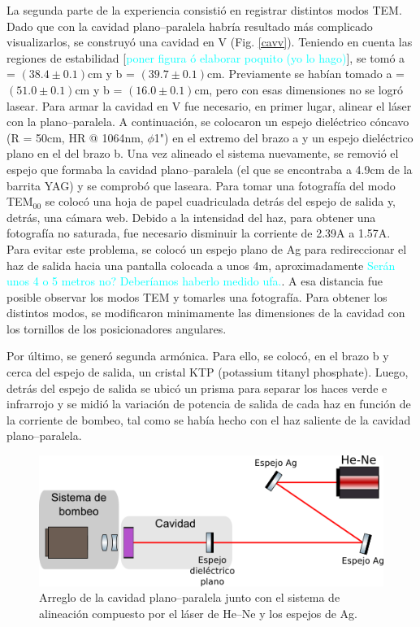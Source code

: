 \documentclass[10pt, a4paper]{article}%
\begin{document}
\begin{multicols}{2}
La segunda parte de la experiencia consistió en registrar distintos modos TEM. Dado que con la cavidad plano--paralela habría resultado más complicado visualizarlos, se construyó una cavidad en V (Fig. \ref{cavv}). Teniendo en cuenta las regiones de estabilidad [\textcolor{cyan}{poner figura ó elaborar poquito (yo lo hago)}], se tomó a = $(38.4 \pm 0.1)$cm y b = $(39.7 \pm 0.1)$cm. Previamente se habían tomado a = $(51.0 \pm 0.1)$cm y b = $(16.0 \pm 0.1)$cm, pero con esas dimensiones no se logró lasear. Para armar la cavidad en V fue necesario, en primer lugar, alinear el láser con la plano--paralela. A continuación, se colocaron un espejo dieléctrico cóncavo  (R = 50cm, HR @ 1064nm, $\phi$1") en el extremo del brazo a y un espejo dieléctrico plano en el del brazo b. Una vez alineado el sistema nuevamente, se removió el espejo que formaba la cavidad plano--paralela (el que se encontraba a 4.9cm de la barrita YAG) y se comprobó que laseara.
Para tomar una fotografía del modo TEM$_{00}$ se colocó una hoja de papel cuadriculada detrás del espejo de salida y, detrás, una cámara web. Debido a la intensidad del haz, para obtener una fotografía no saturada, fue necesario disminuir la corriente de 2.39A a 1.57A. Para evitar este problema, se colocó un espejo plano de Ag para redireccionar el haz de salida hacia una pantalla colocada a unos 4m, aproximadamente \textcolor{cyan}{Serán unos 4 o 5 metros no? Deberíamos haberlo medido ufa.}. A esa distancia fue posible observar los modos TEM y tomarles una fotografía. Para obtener los distintos modos, se modificaron minimamente las dimensiones de la cavidad con los tornillos de los posicionadores angulares. 

Por último, se generó segunda armónica. Para ello, se colocó, en el brazo b y cerca del espejo de salida, un cristal KTP (potassium titanyl phosphate). Luego, detrás del espejo de salida se ubicó un prisma para separar los haces verde e infrarrojo y se midió la variación de potencia de salida de cada haz en función de la corriente de bombeo, tal como se había hecho con el haz saliente de la cavidad plano--paralela.   



\begin{figure}[H]
    \centering
    \includegraphics[scale=0.5]{Graficos/cavplana.png}
    \caption{Arreglo de la cavidad plano--paralela junto con el sistema de alineación compuesto por el láser de He--Ne y los espejos de Ag.}
    \label{cavplana}
\end{figure}




\end{multicols}
\end{document}
